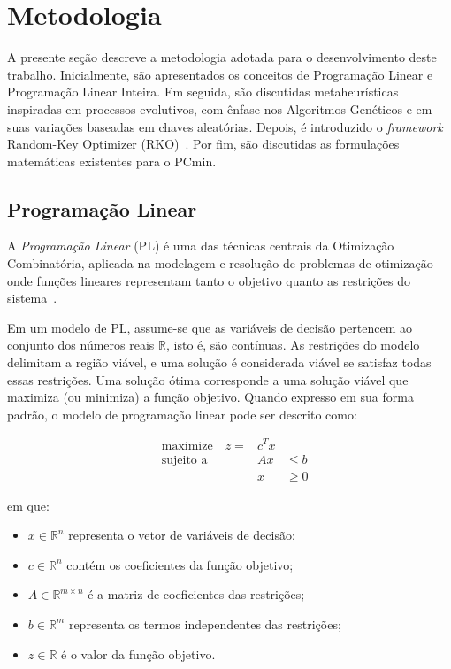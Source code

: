 \section{Metodologia}

A presente seção descreve a metodologia adotada para o desenvolvimento deste trabalho. Inicialmente, são apresentados os conceitos de Programação Linear e Programação Linear Inteira. Em seguida, são discutidas metaheurísticas inspiradas em processos evolutivos, com ênfase nos Algoritmos Genéticos e em suas variações baseadas em chaves aleatórias. Depois, é introduzido o \emph{framework} Random-Key Optimizer (RKO)~\cite{Chaves2023}. Por fim, são discutidas as formulações matemáticas existentes para o PCmin.

\subsection{Programação Linear}

A \textit{Programação Linear} (PL) é uma das técnicas centrais da Otimização Combinatória, aplicada na modelagem e resolução de problemas de otimização onde funções lineares representam tanto o objetivo quanto as restrições do sistema~\cite{Goldbarg2005}.

Em um modelo de PL, assume-se que as variáveis de decisão pertencem ao conjunto dos números reais $\mathbb{R}$, isto é, são contínuas. As restrições do modelo delimitam a região viável, e uma solução é considerada viável se satisfaz todas essas restrições. Uma solução ótima corresponde a uma solução viável que maximiza (ou minimiza) a função objetivo. Quando expresso em sua forma padrão, o modelo de programação linear pode ser descrito como:

\[
    \begin{aligned}
    &\text{maximize} \quad  z  = &c^T x \\
    &\text{sujeito a} \quad & Ax & \leq  b \\
    & & x & \geq  0
    \end{aligned}
\]

em que:
\begin{itemize}
    \item $x \in \mathbb{R}^n$ representa o vetor de variáveis de decisão;
    \item $c \in \mathbb{R}^n$ contém os coeficientes da função objetivo;
    \item $A \in \mathbb{R}^{m \times n}$ é a matriz de coeficientes das restrições;
    \item $b \in \mathbb{R}^m$ representa os termos independentes das restrições;
    \item $z \in \mathbb{R}$ é o valor da função objetivo.
\end{itemize}

